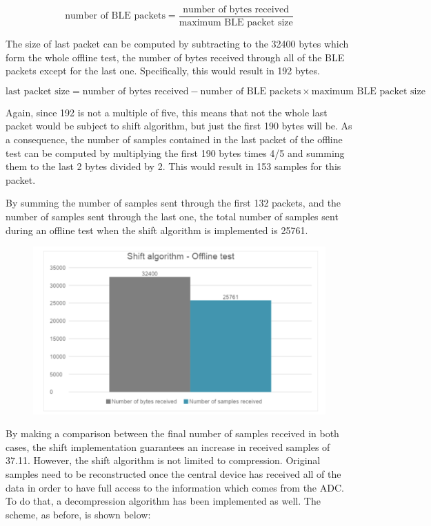\documentclass{Configuration_Files/PoliMi3i_thesis}
\begin{document}
\[
\text{number of BLE packets} = \frac{\text{number of bytes received}}{\text{maximum BLE packet size}} \tag{Equation 1}
\]

The size of last packet can be computed by subtracting to the 32400 bytes which form the whole offline test, the number of bytes received through all of the BLE packets except for the last one. Specifically, this would result in 192 bytes.

\[
\text{last packet size} = \text{number of bytes received} - \text{number of BLE packets} \times \text{maximum BLE packet size}
\]

Again, since 192 is not a multiple of five, this means that not the whole last packet would be subject to shift algorithm, but just the first 190 bytes will be. As a consequence, the number of samples contained in the last packet of the offline test can be computed by multiplying the first 190 bytes times 4/5 and summing them to the last 2 bytes divided by 2. This would result in 153 samples for this packet.

By summing the number of samples sent through the first 132 packets, and the number of samples sent through the last one, the total number of samples sent during an offline test when the shift algorithm is implemented is 25761.

\begin{figure}[H]
    \centering
    \includegraphics[scale=0.7]{Shift Algorithm/Screenshot 2024-07-22 at 22.31.45.png}
    \label{fig:pairing_procedure}
\end{figure}

By making a comparison between the final number of samples received in both cases, the shift implementation guarantees an increase in received samples of 37.11. However, the shift algorithm is not limited to compression. Original samples need to be reconstructed once the central device has received all of the data in order to have full access to the information which comes from the ADC. To do that, a decompression algorithm has been implemented as well. The scheme, as before, is shown below:
\end{document}
